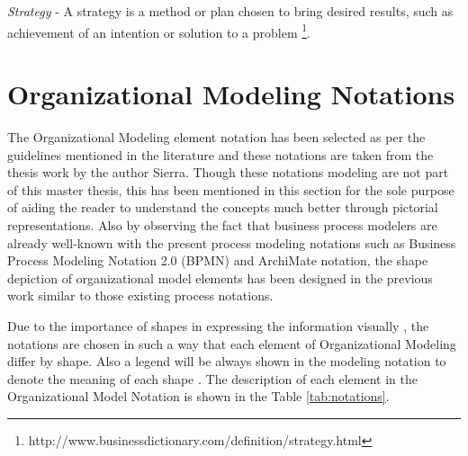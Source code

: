\textit{Strategy} -  A  strategy is a method or plan chosen to bring  desired results, such as achievement of an intention or solution to a problem \footnote{http://www.businessdictionary.com/definition/strategy.html}. 

\section{Organizational Modeling Notations}
\label{sec:resourcecentricorganizationalmodeling}
The Organizational Modeling element notation has been selected as per the guidelines mentioned in the literature \cite{Moody2009} and these notations are taken from the thesis work by the author Sierra\cite{Sierr2015}. Though these notations modeling are not part of this master thesis, this has been mentioned in this section for the sole purpose of aiding the reader to understand the concepts much better through pictorial representations. Also by observing  the fact that business process modelers are already well-known with the present process modeling notations such as Business Process Modeling Notation 2.0 (BPMN) \cite{bpm2011} and ArchiMate notation\cite{arc2013}, the shape depiction of organizational model elements has been designed in the previous work \cite{Sierr2015} similar to those existing process notations. 

Due to the importance of shapes in expressing the information visually , the notations are chosen in such a way that each element of Organizational Modeling  differ by shape. Also a legend will be always shown in the modeling notation to denote the meaning of each shape \cite{Moody2009}. The description of each element in the Organizational Model Notation is shown in the Table \ref{tab:notations}. 

